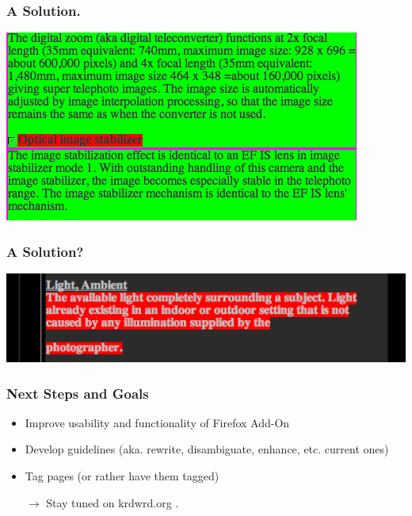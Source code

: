\begin{frame}
	\frametitle{A Solution.}
	\begin{center}
		\includegraphics[width=\textwidth]{20080522_pics/good.png} %
	\end{center}
\end{frame}

\begin{frame}
	\frametitle{A Solution?}
	\begin{center}
		\includegraphics[width=\textwidth]{20080522_pics/evil.png} %
	\end{center}
\end{frame}

\begin{frame}
	\frametitle{Next Steps and Goals}

	\begin{itemize}
		\item Improve usability and functionality of Firefox Add-On
		\item Develop guidelines (aka. rewrite, disambiguate, enhance, etc. current ones)
		\item Tag pages (or rather have them tagged)
		\item[$\rightarrow$] Stay tuned on krdwrd.org {\tiny \cite{krdwrd.org}}.
	\end{itemize}
\end{frame}
